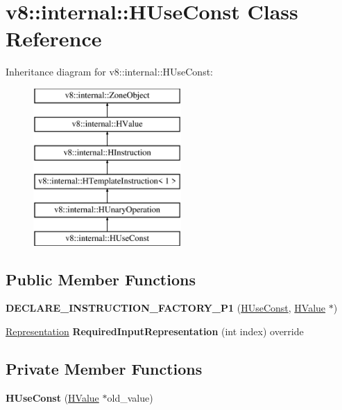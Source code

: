 \hypertarget{classv8_1_1internal_1_1_h_use_const}{}\section{v8\+:\+:internal\+:\+:H\+Use\+Const Class Reference}
\label{classv8_1_1internal_1_1_h_use_const}
Inheritance diagram for v8\+:\+:internal\+:\+:H\+Use\+Const\+:\begin{figure}[H]
\begin{center}
\leavevmode
\includegraphics[height=6.000000cm]{classv8_1_1internal_1_1_h_use_const}
\end{center}
\end{figure}
\subsection*{Public Member Functions}
\begin{DoxyCompactItemize}
\item 
{\bfseries D\+E\+C\+L\+A\+R\+E\+\_\+\+I\+N\+S\+T\+R\+U\+C\+T\+I\+O\+N\+\_\+\+F\+A\+C\+T\+O\+R\+Y\+\_\+\+P1} (\hyperlink{classv8_1_1internal_1_1_h_use_const}{H\+Use\+Const}, \hyperlink{classv8_1_1internal_1_1_h_value}{H\+Value} $\ast$)\hypertarget{classv8_1_1internal_1_1_h_use_const_a0c6a612e93d1d74b025982c0ec8e5372}{}\label{classv8_1_1internal_1_1_h_use_const_a0c6a612e93d1d74b025982c0ec8e5372}

\item 
\hyperlink{classv8_1_1internal_1_1_representation}{Representation} {\bfseries Required\+Input\+Representation} (int index) override\hypertarget{classv8_1_1internal_1_1_h_use_const_a6216def135fa0836be8503e93eba3b30}{}\label{classv8_1_1internal_1_1_h_use_const_a6216def135fa0836be8503e93eba3b30}

\end{DoxyCompactItemize}
\subsection*{Private Member Functions}
\begin{DoxyCompactItemize}
\item 
{\bfseries H\+Use\+Const} (\hyperlink{classv8_1_1internal_1_1_h_value}{H\+Value} $\ast$old\+\_\+value)\hypertarget{classv8_1_1internal_1_1_h_use_const_a26b30f466568a435bc0adda98e4c35f9}{}\label{classv8_1_1internal_1_1_h_use_const_a26b30f466568a435bc0adda98e4c35f9}

\end{DoxyCompactItemize}
